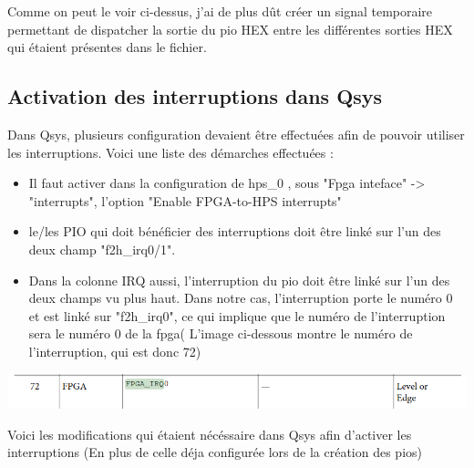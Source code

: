 Comme on peut le voir ci-dessus, j'ai de plus dût créer un signal temporaire permettant de dispatcher la sortie du pio HEX entre les différentes sorties HEX qui étaient présentes dans le fichier.

\subsection{Activation des interruptions dans Qsys}
Dans Qsys, plusieurs configuration devaient être effectuées afin de pouvoir utiliser les interruptions. Voici une liste des démarches effectuées : \\

\begin{itemize}
	\item Il faut activer dans la configuration de hps\_0 , sous "Fpga inteface" -> "interrupts", l'option "Enable FPGA-to-HPS interrupts"
	\item le/les PIO qui doit bénéficier des interruptions doit être linké sur l'un des deux champ "f2h\_irq0/1".
	\item Dans la colonne IRQ aussi, l'interruption du pio doit être linké sur l'un des deux champs vu plus haut. Dans notre cas, l'interruption porte le numéro 0 et est linké sur "f2h\_irq0", ce qui implique que le numéro de l'interruption sera le numéro 0 de la fpga( L'image ci-dessous montre le numéro de l'interruption, qui est donc 72)\\
\end{itemize}

\includegraphics[scale=0.5]{./images/fpga_irq0.png}

Voici les modifications qui étaient nécéssaire dans Qsys afin d'activer les interruptions (En plus de celle déja configurée lors de la création des pios)

